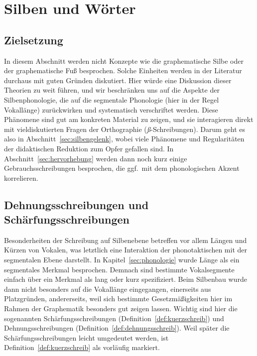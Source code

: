 \section{Silben und Wörter}

\label{sec:silbenschreib}

\subsection{Zielsetzung}

In diesem Abschnitt werden nicht Konzepte wie die graphematische Silbe oder der graphematische Fuß besprochen.
Solche Einheiten werden in der Literatur durchaus mit guten Gründen diskutiert.
Hier würde eine Diskussion dieser Theorien zu weit führen, und wir beschränken uns auf die Aspekte der Silbenphonologie, die auf die segmentale Phonologie (hier in der Regel Vokallänge) zurückwirken und systematisch verschriftet werden.
Diese Phänomene sind gut am konkreten Material zu zeigen, und sie interagieren direkt mit vieldiskutierten Fragen der Orthographie (\zB \textit{ß}-Schreibungen).
Darum geht es also in Abschnitt~\ref{sec:silbengelenk}, wobei viele Phänomene und Regularitäten der didaktischen Reduktion zum Opfer gefallen sind.
In Abschnitt~\ref{sec:hervorhebung} werden dann noch kurz einige Gebrauchsschreibungen besprochen, die ggf.\ mit dem phonologischen Akzent korrelieren.

\subsection{Dehnungsschreibungen und Schärfungsschreibungen}

\label{sec:laengeschreib}

Besonderheiten der Schreibung auf Silbenebene betreffen vor allem Längen und Kürzen von Vokalen, was letztlich eine Interaktion der phonotaktischen mit der segmentalen Ebene darstellt.
In Kapitel~\ref{sec:phonologie} wurde Länge als ein segmentales Merkmal besprochen.
Demnach sind bestimmte Vokalsegmente einfach über ein Merkmal als lang oder kurz spezifiziert.
Beim Silbenbau wurde dann nicht besonders auf die Vokallänge eingegangen, einerseits aus Platzgründen, andererseits, weil sich bestimmte Gesetzmäßigkeiten hier im Rahmen der Graphematik besonders gut zeigen lassen.
Wichtig sind hier die sogenannten Schärfungsschreibungen (Definition~\ref{def:kuerzschreib}) und Dehnungsschreibungen (Definition~\ref{def:dehnungsschreib}).
Weil später die Schärfungsschreibungen leicht umgedeutet werden, ist Definition~\ref{def:kuerzschreib} als vorläufig markiert.

